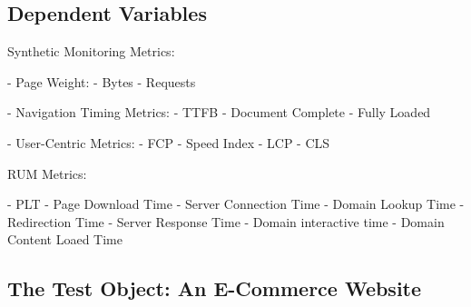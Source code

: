 

\subsection{Dependent Variables}



Synthetic Monitoring Metrics:

- Page Weight:
	- Bytes
	- Requests
	
- Navigation Timing Metrics:
	- TTFB
	- Document Complete
	- Fully Loaded
	
- User-Centric Metrics:
	- FCP
	- Speed Index
	- LCP
	- CLS


RUM Metrics:

- PLT
- Page Download Time
- Server Connection Time
- Domain Lookup Time
- Redirection Time
- Server Response Time
- Domain interactive time
- Domain Content Loaed Time






\subsection{The Test Object: An E-Commerce Website}





